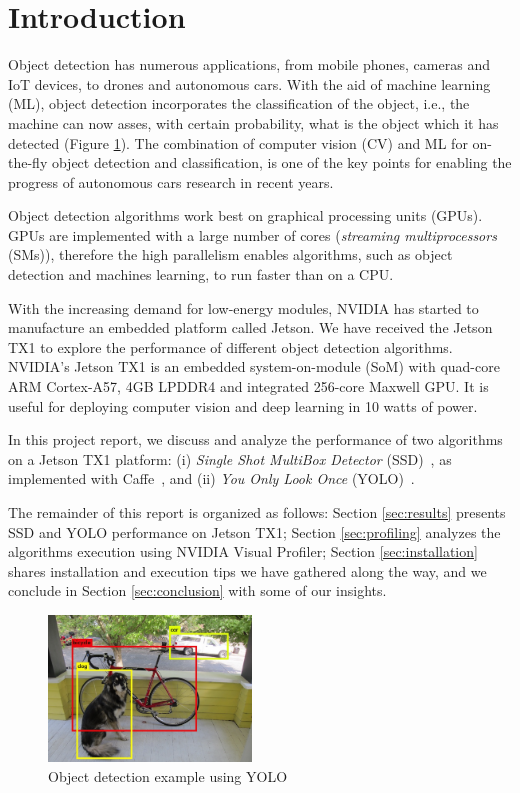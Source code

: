 \section{Introduction}
\label{sec:intro}

Object detection has numerous applications, from mobile phones, cameras and IoT devices, to drones and autonomous cars. With the aid of machine learning (ML), object detection incorporates the classification of the object, i.e., the machine can now asses, with certain probability, what is the object which it has detected (Figure \ref{fig:detection_example}). The combination of computer vision (CV) and ML for on-the-fly object detection and classification, is one of the key points
for enabling the progress of autonomous cars research in recent years.

Object detection algorithms work best on graphical processing units (GPUs). GPUs are implemented with a large number of cores (\textit{streaming multiprocessors} (SMs)), therefore the high parallelism enables algorithms, such as object detection and machines learning, to run faster than on a CPU.

With the increasing demand for low-energy modules, NVIDIA has started to manufacture an embedded platform called Jetson. We have received the Jetson TX1 to explore the performance of different object detection algorithms. NVIDIA's Jetson TX1 is an embedded system-on-module (SoM) with quad-core ARM Cortex-A57, 4GB LPDDR4 and integrated 256-core Maxwell GPU. It is useful for deploying computer vision and deep learning in 10 watts of power.

In this project report, we discuss and analyze the performance of two algorithms on a Jetson TX1 platform: (i) \textit{Single Shot MultiBox Detector} (SSD)~\cite{liu2016ssd}, as implemented with Caffe~\cite{caffeoriginal}, and (ii) \textit{You Only Look Once} (YOLO)~\cite{redmon2016you}.

The remainder of this report is organized as follows: Section \ref{sec:results} presents SSD and YOLO performance on Jetson TX1; Section \ref{sec:profiling} analyzes the algorithms execution using NVIDIA Visual Profiler; Section \ref{sec:installation} shares installation and execution tips we have gathered along the way, and we conclude in Section \ref{sec:conclusion} with some of our insights.

\begin{figure}[t]
	\includegraphics[width=0.48\textwidth]{./imgs/detection_example.png}
	\caption{Object detection example using YOLO}
	\label{fig:detection_example}
\end{figure}
